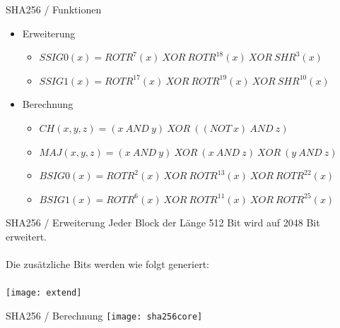 \documentclass{beamer}
\begin{document}
    \begin{frame}{SHA256 / Funktionen}
      \begin{itemize}
      \setlength{\itemsep}{20pt}
      \item Erweiterung
        \begin{itemize}
          \setlength{\itemsep}{10pt}
          \item $ SSIG0(x) = ROTR^{7}(x)~XOR~ROTR^{18}(x)~XOR~SHR^{3}(x) $
          \item $ SSIG1(x) = ROTR^{17}(x)~XOR~ROTR^{19}(x)~XOR~SHR^{10}(x) $
        \end{itemize}
      \item Berechnung
        \begin{itemize}
          \setlength{\itemsep}{10pt}
          \item $ CH( x, y, z) = (x~AND~y)~XOR~( (NOT~x)~AND~z) $
          \item $ MAJ( x, y, z) = (x~AND~y)~XOR~(x~AND~z)~XOR~(y~AND~z) $
          \item $ BSIG0(x) = ROTR^{2}(x)~XOR~ROTR^{13}(x)~XOR~ROTR^{22}(x) $
          \item $ BSIG1(x) = ROTR^{6}(x)~XOR~ROTR^{11}(x)~XOR~ROTR^{25}(x) $
        \end{itemize}
      \end{itemize}
    \end{frame}
    \begin{frame}{SHA256 / Erweiterung}
      Jeder Block der Länge 512 Bit wird auf 2048 Bit erweitert.\\
      ~\\
      Die zusätzliche Bits werden wie folgt generiert:\\
      ~\\
      \texttt{[image: extend]}
    \end{frame}
    \begin{frame}{SHA256 / Berechnung}
      \texttt{[image: sha256core]}
    \end{frame}
\end{document}
